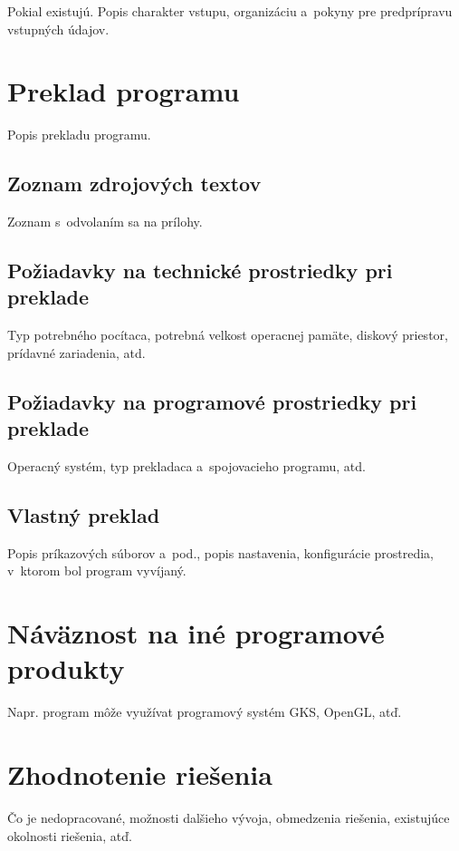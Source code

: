\documentclass[a4paper]{feidipsp}
\begin{document}
Pokial existujú. Popis charakter vstupu, organizáciu a~pokyny pre predprípravu  vstupných údajov.

\section{Preklad programu}

Popis prekladu programu.

\subsection{Zoznam zdrojových textov}

Zoznam s~odvolaním sa na prílohy.

\subsection{Požiadavky na technické prostriedky pri preklade}

Typ potrebného pocítaca, potrebná velkost operacnej pamäte, diskový priestor, prídavné zariadenia, atd.

\subsection{Požiadavky na programové prostriedky pri preklade}

Operacný systém, typ prekladaca a~spojovacieho programu, atd.

\subsection{Vlastný preklad}

Popis príkazových súborov a~pod., popis  nastavenia, konfigurácie prostredia, v~ktorom bol program vyvíjaný.

\section{Náväznost na iné programové produkty}

Napr. program môže využívat programový systém GKS, OpenGL, atď.

\section{Zhodnotenie riešenia}

Čo je nedopracované, možnosti dalšieho vývoja, obmedzenia riešenia, existujúce okolnosti riešenia, atď.
\end{document}
